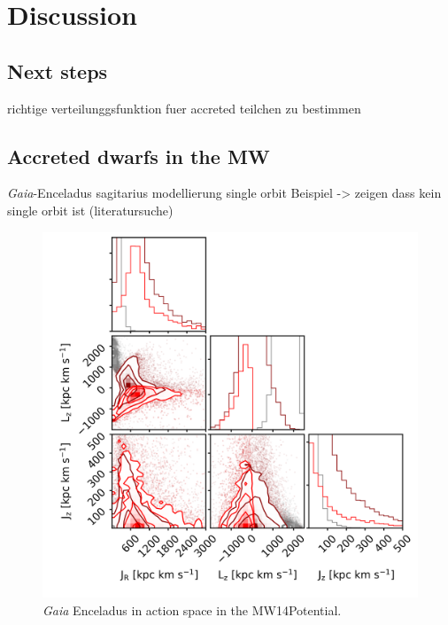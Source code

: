 \section{Discussion} \label{sec:Discussion}
\subsection{Next steps}
richtige verteilunggsfunktion fuer accreted teilchen zu bestimmen 

\subsection{Accreted dwarfs in the MW}
\textit{Gaia}-Enceladus \cite{Enceladus....Helmi...2018}
sagitarius modellierung single orbit Beispiel
-> zeigen dass kein single orbit ist (literatursuche)

\begin{figure}[htbp]
    \centering
    \includegraphics[width=1.0\textwidth]{plots/Discussion/Gaia_all_actions_MW14_talk3.png}
    \caption{\textit{Gaia} Enceladus in action space in the MW14Potential.}
    \label{fig:act_both_merg_best_pot}
\end{figure}
